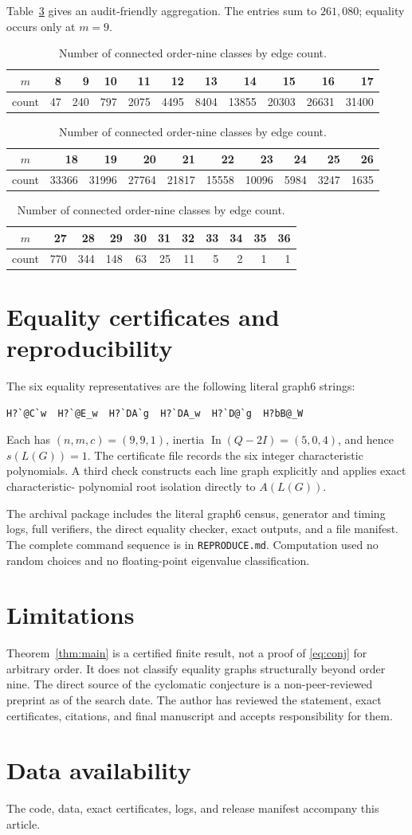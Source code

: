 \documentclass[11pt]{amsart}
\begin{document}
Table~\ref{tab:edgecounts} gives an audit-friendly aggregation. The entries
sum to $261{,}080$; equality occurs only at $m=9$.
\begin{table}[ht]
\centering\scriptsize
\caption{Number of connected order-nine classes by edge count.}\label{tab:edgecounts}
\begin{tabular}{crrrrrrrrrr}\toprule
$m$&8&9&10&11&12&13&14&15&16&17\\\midrule
count&47&240&797&2075&4495&8404&13855&20303&26631&31400\\\bottomrule
\end{tabular}
\vspace{4pt}
\begin{tabular}{crrrrrrrrr}\toprule
$m$&18&19&20&21&22&23&24&25&26\\\midrule
count&33366&31996&27764&21817&15558&10096&5984&3247&1635\\\bottomrule
\end{tabular}
\vspace{4pt}
\begin{tabular}{crrrrrrrrrr}\toprule
$m$&27&28&29&30&31&32&33&34&35&36\\\midrule
count&770&344&148&63&25&11&5&2&1&1\\\bottomrule
\end{tabular}
\end{table}

\section{Equality certificates and reproducibility}
The six equality representatives are the following literal graph6 strings:
\begin{verbatim}
H?`@C`w  H?`@E_w  H?`DA`g  H?`DA_w  H?`D@`g  H?bB@_W
\end{verbatim}
Each has $(n,m,c)=(9,9,1)$, inertia
$\operatorname{In}(Q-2I)=(5,0,4)$, and hence $s(L(G))=1$. The certificate
file records the six integer characteristic polynomials. A third check
constructs each line graph explicitly and applies exact characteristic-
polynomial root isolation directly to $A(L(G))$.

The archival package includes the literal graph6 census, generator and timing
logs, full verifiers, the direct equality checker, exact outputs, and a file
manifest. The complete command sequence is in \texttt{REPRODUCE.md}.
Computation used no random choices and no floating-point eigenvalue
classification.

\section{Limitations}
Theorem~\ref{thm:main} is a certified finite result, not a proof of
\eqref{eq:conj} for arbitrary order. It does not classify equality graphs
structurally beyond order nine. The direct source of the cyclomatic
conjecture is a non-peer-reviewed preprint as of the search date. The author
has reviewed the statement, exact certificates, citations, and final
manuscript and accepts responsibility for them.

\section*{Data availability}
The code, data, exact certificates, logs, and release manifest accompany this
article.
\enlargethispage{5\baselineskip}
\footnotesize

\end{document}
